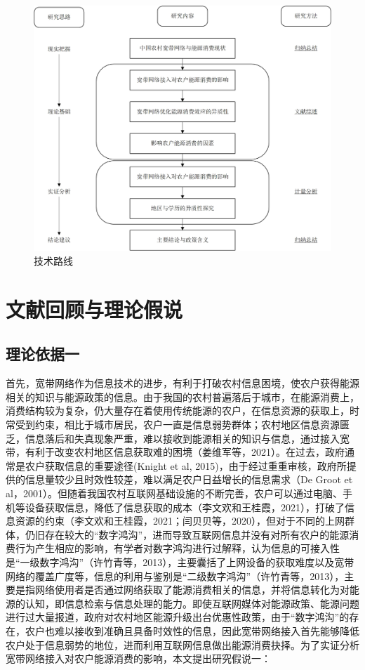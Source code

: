\documentclass[a4paper, 12pt, oneside]{article} %
\begin{document}
	~\ %
	\begin{figure}[htbp]
		\centering
		\includegraphics[width = 1\textwidth]{技术路线.jpg}
		{\heiti {} \caption{技术路线}}
	\end{figure}
	\section{文献回顾与理论假说}
	\subsection{理论依据一}
	首先，宽带网络作为信息技术的进步，有利于打破农村信息困境，使农户获得能源相关的知识与能源政策的信息。由于我国的农村普遍落后于城市，在能源消费上，消费结构较为复杂，仍大量存在着使用传统能源的农户，在信息资源的获取上，时常受到约束，相比于城市居民，农户一直是信息弱势群体；农村地区信息资源匮乏，信息落后和失真现象严重，难以接收到能源相关的知识与信息，通过接入宽带，有利于改变农村地区信息获取难的困境（姜维军等，2021）。在过去，政府通常是农户获取信息的重要途径(Knight et al, 2015)，由于经过重重审核，政府所提供的信息量较少且时效性较差，难以满足农户日益增长的信息需求（De Groot et al，2001）。但随着我国农村互联网基础设施的不断完善，农户可以通过电脑、手机等设备获取信息，降低了信息获取的成本（李文欢和王桂霞，2021），打破了信息资源的约束（李文欢和王桂霞，2021；闫贝贝等，2020），但对于不同的上网群体，仍旧存在较大的“数字鸿沟”，进而导致互联网信息并没有对所有农户的能源消费行为产生相应的影响，有学者对数字鸿沟进行过解释，认为信息的可接入性是“一级数字鸿沟”（许竹青等，2013），主要囊括了上网设备的获取难度以及宽带网络的覆盖广度等，信息的利用与鉴别是“二级数字鸿沟”（许竹青等，2013），主要是指网络使用者是否通过网络获取了能源消费相关的信息，并将信息转化为对能源的认知，即信息检索与信息处理的能力。即使互联网媒体对能源政策、能源问题进行过大量报道，政府对农村地区能源升级出台优惠性政策，由于“数字鸿沟”的存在，农户也难以接收到准确且具备时效性的信息，因此宽带网络接入首先能够降低农户处于信息弱势的地位，进而利用互联网信息做出能源消费抉择。为了实证分析宽带网络接入对农户能源消费的影响，本文提出研究假说一：
	
\end{document}

